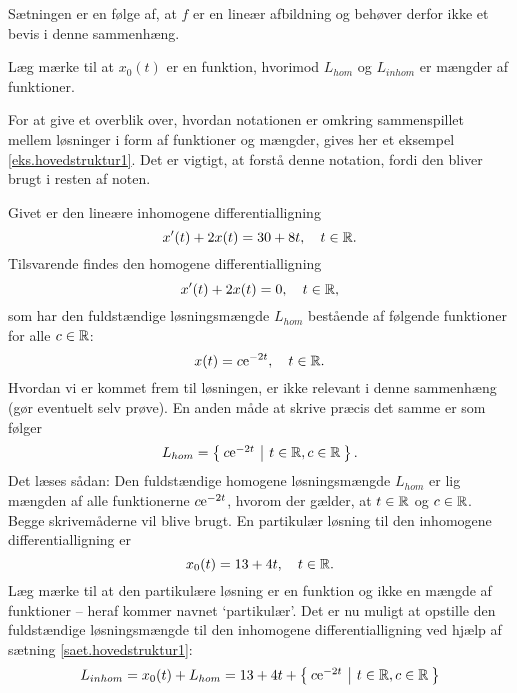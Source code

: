 Sætningen er en følge af, at $ f $ er en lineær afbildning og behøver derfor ikke et bevis i denne sammenhæng.

\begin{obs}
Læg mærke til at $ x_0(t) $ er en funktion, hvorimod $ L_{hom} $ og $ L_{inhom} $ er mængder af funktioner.
\end{obs}
For at give et overblik over, hvordan notationen er omkring sammenspillet mellem løsninger i form af funktioner og mængder, gives her et eksempel \ref{eks.hovedstruktur1}. Det er vigtigt, at forstå denne notation, fordi den bliver brugt i resten af noten.

\begin{example}[Løsningsstruktur] \label{eks.hovedstruktur1}
Givet er den lineære inhomogene differentialligning
\begin{equation}
x'(t) + 2x(t) = 30 + 8t, \quad t \in \mathbb{R}.
\end{equation}
Tilsvarende findes den homogene differentialligning
\begin{equation}
x'(t) + 2x(t) = 0, \quad t \in \mathbb{R},
\end{equation}
som har den fuldstændige løsningsmængde $ L_{hom} $ bestående af følgende funktioner for alle $ c \in \mathbb{R} $:
\begin{equation}
x(t) = c \mathrm{e}^{-2t}, \quad t \in \mathbb{R}.
\end{equation}
Hvordan vi er kommet frem til løsningen, er ikke relevant i denne sammenhæng (gør eventuelt selv prøve). En anden måde at skrive præcis det samme er som følger
\begin{equation}
L_{hom} = \left\lbrace \hspace*{-1mm} \begin{array}{c|c} c\mathrm{e}^{-2t} & t \in \mathbb{R}, c \in \mathbb{R} \end{array} \hspace*{-1mm} \right\rbrace.
\end{equation}
Det læses sådan: Den fuldstændige homogene løsningsmængde $ L_{hom} $ er lig mængden af alle funktionerne $ c\mathrm{e}^{-2t} $, hvorom der gælder, at $ t \in \mathbb{R} $ og $ c \in \mathbb{R} $. Begge skrivemåderne vil blive brugt. \bs
En partikulær løsning til den inhomogene differentialligning er
\begin{equation}
x_0(t) = 13 + 4t, \quad t \in \mathbb{R}.
\end{equation}
Læg mærke til at den partikulære løsning er en funktion og ikke en mængde af funktioner -- heraf kommer navnet `partikulær'. Det er nu muligt at opstille den fuldstændige løsningsmængde til den inhomogene differentialligning ved hjælp af sætning \ref{saet.hovedstruktur1}:
\begin{equation}
\begin{aligned}
L_{inhom} &= x_0(t) + L_{hom} = 13 + 4t + \maengde{c\e^{-2t}}{t \in \reel, c \in \reel} \\

\end{aligned}
\end{equation}
\end{example}
